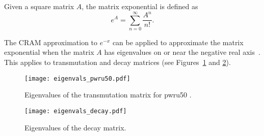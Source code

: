 Given a square matrix $A$, the matrix exponential is defined
as~\cite{ationneeded}
\begin{equation}
  e^{A} = \sum_{n=0}^\infty \frac{A^n}{n!}.
\end{equation}

The CRAM approximation to $e^{-x}$ can be applied to approximate the matrix
exponential when the matrix $A$ has eigenvalues on or near the negative real
axis~\cite{pusa2010computing}. This applies to transmutation and decay
matrices (see Figures~\ref{fig:eigenvals-pwru50} and \ref{fig:eigenvals-decay}).

\begin{figure}[!ht]
\centering
\texttt{[image: eigenvals\_pwru50.pdf]}
\caption{Eigenvalues of the transmutation matrix for pwru50 .}
\label{fig:eigenvals-pwru50}
\end{figure}

\begin{figure}[!ht]
\centering
\texttt{[image: eigenvals\_decay.pdf]}
\caption{Eigenvalues of the decay matrix.}
\label{fig:eigenvals-decay}
\end{figure}


